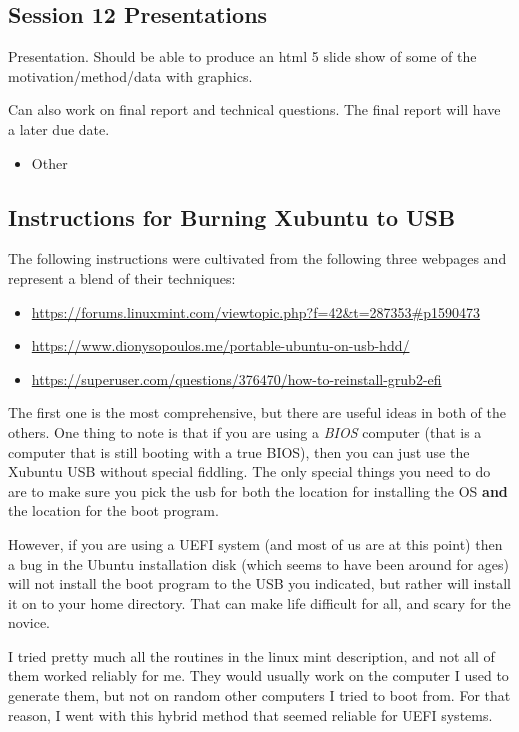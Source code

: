 \documentclass{article}
\begin{document}
\subsection{Session 12 Presentations}
\label{sec:org0adef0d}
Presentation. Should be able to produce an html 5 slide show of some of the motivation/method/data with graphics.

Can also work on final report and technical questions. The final report will have a later due date. 
\begin{itemize}
\item Other
\end{itemize}
\subsection{Instructions for Burning Xubuntu to USB}
\label{sec:orgc3c142a}
The following instructions were cultivated from the following three webpages and represent a blend of their techniques:
\begin{itemize}
\item \url{https://forums.linuxmint.com/viewtopic.php?f=42\&t=287353\#p1590473}
\item \url{https://www.dionysopoulos.me/portable-ubuntu-on-usb-hdd/}
\item \url{https://superuser.com/questions/376470/how-to-reinstall-grub2-efi}
\end{itemize}

The first one is the most comprehensive, but there are useful ideas in both of the others. One thing to note is that if you are using a \emph{BIOS} computer (that is a computer that is still booting with a true BIOS), then you can just use the Xubuntu USB without special fiddling. The only special things you need to do are to make sure you pick the usb for both the location for installing the OS \textbf{and} the location for the boot program. 

However, if you are using a UEFI system (and most of us are at this point) then a bug in the Ubuntu installation disk (which seems to have been around for ages) will not install the boot program to the USB you indicated, but rather will install it on to your home directory. That can make life difficult for all, and scary for the novice. 

I tried pretty much all the routines in the linux mint description, and not all of them worked reliably for me. They would usually work on the computer I used to generate them, but not on random other computers I tried to boot from. For that reason, I went with this hybrid method that seemed reliable for UEFI systems.
\end{document}
